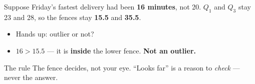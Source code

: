 \documentclass[aspectratio=169, 11pt]{beamer}
\newcommand{\redink}[1]{{\color{redacc}\bfseries #1}}
\begin{document}
\begin{frame}[t, plain]
  \vspace{6pt}
  Suppose Friday's fastest delivery had been \textbf{16 minutes}, not 20. $Q_1$ and $Q_3$ stay
  23 and 28, so the fences stay \textbf{15.5} and \textbf{35.5}.
  \vspace{10pt}
  \begin{itemize}\setlength{\itemsep}{6pt}
    \item Hands up: outlier or not?
    \item $16 > 15.5$ --- it is \redink{inside} the lower fence. \textbf{Not an outlier.}
  \end{itemize}
  \vspace{10pt}
  \begin{block}{The rule}
    The fence decides, not your eye. ``Looks far'' is a reason to \emph{check} --- never the
    answer.
  \end{block}
\end{frame}
\end{document}
